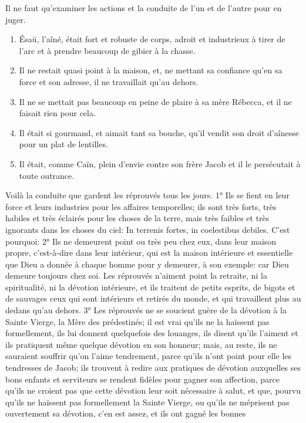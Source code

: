 Il ne faut qu'examiner les actions et la conduite de l'un et de l'autre pour en juger.
\begin{enumerate}[label=\arabic*°]
  \item Ésaü, l'aîné, était fort et robuste de corps, adroit et industrieux à tirer de l'arc et à prendre beaucoup de gibier à la chasse.
  \item Il ne restait quasi point à la maison, et, ne mettant sa confiance qu'en sa force et son adresse, il ne travaillait qu'au dehors.
  \item Il ne se mettait pas beaucoup en peine de plaire à sa mère Rébecca, et il ne faisait rien pour cela.
  \item Il était si gourmand, et aimait tant sa bouche, qu'il vendit son droit d'aînesse pour un plat de lentilles.
  \item Il était, comme Caïn, plein d'envie contre son frère Jacob et il le persécutait à toute outrance.
\end{enumerate}
 Voilà la conduite que gardent les réprouvés tous les jours.
1° Ils se fient en leur force et leurs industries pour les affaires temporelles; ils sont très forts, très habiles et très
éclairés pour les choses de la terre, mais très faibles et très ignorants dans les choses du ciel: In terrenis fortes, in
coelestibus debiles. C'est pourquoi:
 2° Ils ne demeurent point ou très peu chez eux, dans leur maison propre, c'est-à-dire dans leur intérieur, qui
est la maison intérieure et essentielle que Dieu a donnée à chaque homme pour y demeurer, à son exemple: car
Dieu demeure toujours chez soi. Les réprouvés n'aiment point la retraite, ni la spiritualité, ni la dévotion intérieure,
et ils traitent de petits esprits, de bigots et de sauvages ceux qui sont intérieurs et retirés du monde, et qui
travaillent plus au dedans qu'au dehors.
 3° Les réprouvés ne se soucient guère de la dévotion à la Sainte Vierge, la Mère des prédestinés; il est vrai
qu'ils ne la haïssent pas formellement, ils lui donnent quelquefois des louanges, ils disent qu'ils l'aiment et ils
pratiquent même quelque dévotion en son honneur; mais, au reste, ils ne sauraient souffrir qu'on l'aime
tendrement, parce qu'ils n'ont point pour elle les tendresses de Jacob; ils trouvent à redire aux pratiques de
dévotion auxquelles ses bons enfants et serviteurs se rendent fidèles pour gagner son affection, parce qu'ils ne
croient pas que cette dévotion leur soit nécessaire à salut, et que, pourvu qu'ils ne haïssent pas formellement la
Sainte Vierge, ou qu'ils ne méprisent pas ouvertement sa dévotion, c'en est assez, et ils ont gagné les bonnes
